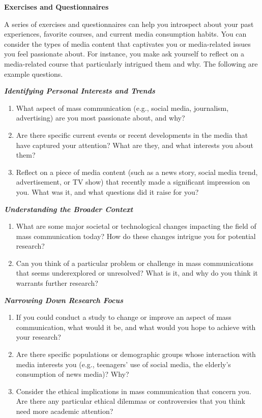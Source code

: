 \documentclass[
]{book}
\providecommand{\tightlist}{%
  \setlength{\itemsep}{0pt}\setlength{\parskip}{0pt}}
\begin{document}
\textbf{Exercises and Questionnaires}

A series of exercises and questionnaires can help you introspect about your past experiences, favorite courses, and current media consumption habits. You can consider the types of media content that captivates you or media-related issues you feel passionate about. For instance, you make ask yourself to reflect on a media-related course that particularly intrigued them and why. The following are example questions.

\textbf{\emph{Identifying Personal Interests and Trends}}

\begin{enumerate}
\def\labelenumi{\arabic{enumi}.}
\tightlist
\item
  What aspect of mass communication (e.g., social media, journalism, advertising) are you most passionate about, and why?
\item
  Are there specific current events or recent developments in the media that have captured your attention? What are they, and what interests you about them?
\item
  Reflect on a piece of media content (such as a news story, social media trend, advertisement, or TV show) that recently made a significant impression on you. What was it, and what questions did it raise for you?
\end{enumerate}

\textbf{\emph{Understanding the Broader Context}}

\begin{enumerate}
\def\labelenumi{\arabic{enumi}.}
\setcounter{enumi}{3}
\tightlist
\item
  What are some major societal or technological changes impacting the field of mass communication today? How do these changes intrigue you for potential research?
\item
  Can you think of a particular problem or challenge in mass communications that seems underexplored or unresolved? What is it, and why do you think it warrants further research?
\end{enumerate}

\textbf{\emph{Narrowing Down Research Focus}}

\begin{enumerate}
\def\labelenumi{\arabic{enumi}.}
\setcounter{enumi}{5}
\tightlist
\item
  If you could conduct a study to change or improve an aspect of mass communication, what would it be, and what would you hope to achieve with your research?
\item
  Are there specific populations or demographic groups whose interaction with media interests you (e.g., teenagers' use of social media, the elderly's consumption of news media)? Why?
\item
  Consider the ethical implications in mass communication that concern you. Are there any particular ethical dilemmas or controversies that you think need more academic attention?
\end{enumerate}
\end{document}
